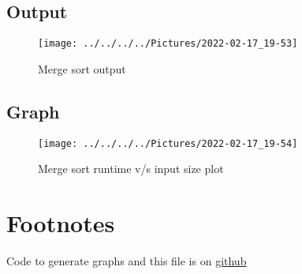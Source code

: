 \documentclass{article}
\begin{document}
    \subsection{Output}
    \begin{figure}[H]
        \centering
        \texttt{[image: ../../../../Pictures/2022-02-17\_19-53]}
        \caption{Merge sort output}
    \end{figure}

    \subsection{Graph}
    \begin{figure}[H]
        \centering
        \texttt{[image: ../../../../Pictures/2022-02-17\_19-54]}
        \caption{Merge sort runtime v/s input size plot}
    \end{figure}

    \section{Footnotes}
    Code to generate graphs and this file is on \href{https://github.com/pranavgade20/algos_complexity_benchmarker}{github}
\end{document}
